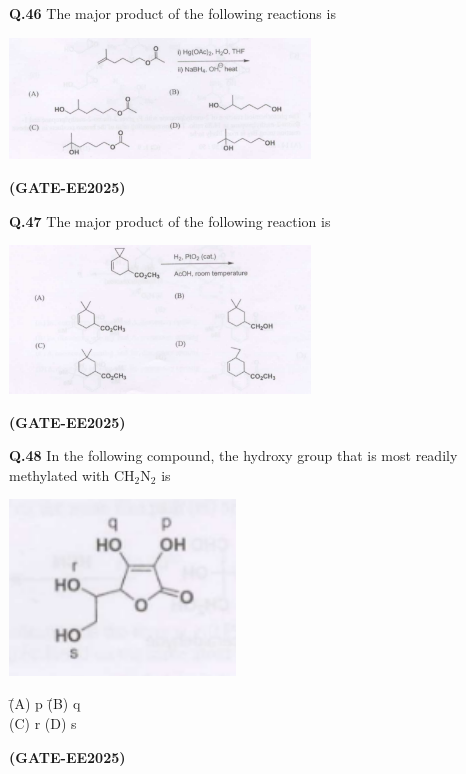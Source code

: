 \documentclass[12pt]{article}
\begin{document}
\begin{enumerate}
\vspace{0.5cm}

\textbf{Q.46} The major product of the following reactions is

\begin{center}
\includegraphics[width=0.6\textwidth]{figs/q46.png}
\end{center}   \textbf{(GATE-EE2025)}


\vspace{0.5cm}

\textbf{Q.47} The major product of the following reaction is

\begin{center}
\includegraphics[width=0.6\textwidth]{figs/q47.png}
\end{center}   \textbf{(GATE-EE2025)}


\vspace{0.5cm}

\textbf{Q.48} \quad In the following compound, the hydroxy group that is most readily methylated with CH$_2$N$_2$ is

\begin{center}
\includegraphics[width=0.45\textwidth]{figs/q48.png}
\end{center}

\begin{tabbing}
\hspace{1cm} \= (A) p \hspace{2cm} \= (B) q \\
\> (C) r \> (D) s
\end{tabbing}   \textbf{(GATE-EE2025)}



\end{enumerate}
\end{document}
